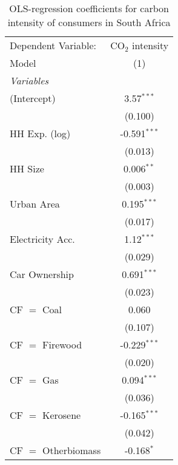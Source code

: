 
\begin{table}[htbp!]
   \centering
   \small
   \begin{adjustbox}{width = 1\textwidth, max height = 0.95\textheight, center}
      \begin{threeparttable}[b]
         \caption{\label{tab:OLS_1_ZAF} OLS-regression coefficients for carbon intensity of consumers in South Africa}
         \begin{tabular}{lc}
            \tabularnewline \midrule \midrule
            Dependent Variable: & CO$_{2}$ intensity\\  
            Model               & (1)\\  
            \midrule
            \emph{Variables}\\
            (Intercept)         & 3.57$^{***}$\\   
                                & (0.100)\\   
            HH Exp. (log)       & -0.591$^{***}$\\   
                                & (0.013)\\   
            HH Size             & 0.006$^{**}$\\   
                                & (0.003)\\   
            Urban Area          & 0.195$^{***}$\\   
                                & (0.017)\\   
            Electricity Acc.    & 1.12$^{***}$\\   
                                & (0.029)\\   
            Car Ownership       & 0.691$^{***}$\\   
                                & (0.023)\\   
            CF $=$ Coal         & 0.060\\   
                                & (0.107)\\   
            CF $=$ Firewood     & -0.229$^{***}$\\   
                                & (0.020)\\   
            CF $=$ Gas          & 0.094$^{***}$\\   
                                & (0.036)\\   
            CF $=$ Kerosene     & -0.165$^{***}$\\   
                                & (0.042)\\   
            CF $=$ Otherbiomass & -0.168$^{*}$\\   

\end{tabular}
\end{threeparttable}
\end{adjustbox}
\end{table}
